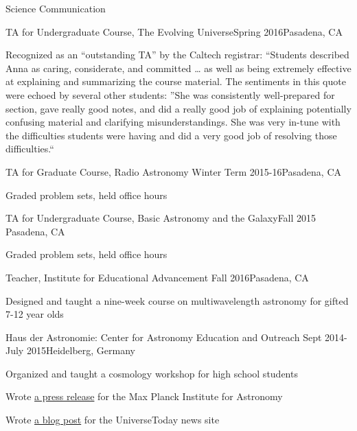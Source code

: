\documentclass{resume} %
\begin{document}
\begin{rSection}{Science Communication}
  \begin{rSubsection}
    {TA for Undergraduate Course, The Evolving Universe}{Spring 2016}{}{Pasadena, CA}
  \item Recognized as an ``outstanding TA'' by the Caltech registrar:
    ``Students described Anna as caring, considerate, and committed \ldots 
    as well as being extremely effective at explaining and summarizing the 
    course material. The sentiments in this quote were echoed by several other 
    students: ''She was consistently well-prepared for section, 
    gave really good notes, and did a really good job of explaining 
    potentially confusing material and clarifying misunderstandings. 
    She was very in-tune with the difficulties students were having 
    and did a very good job of resolving those difficulties.``
  \end{rSubsection}


  \begin{rSubsection}{TA for Graduate Course, Radio Astronomy}
    {Winter Term 2015-16}{}{Pasadena, CA}
  \item Graded problem sets, held office hours
  \end{rSubsection}

  \begin{rSubsection}
    {TA for Undergraduate Course, Basic Astronomy and the Galaxy}{Fall 2015}
    {}{Pasadena, CA}
  \item Graded problem sets, held office hours
  \end{rSubsection}

  \begin{rSubsection}{Teacher, Institute for Educational Advancement}
    {Fall 2016}{}{Pasadena, CA}
  \item Designed and taught a nine-week course on multiwavelength astronomy
    for gifted 7-12 year olds
  \end{rSubsection}

  \begin{rSubsection}
    {Haus der Astronomie: Center for Astronomy Education and Outreach}
    {Sept 2014-July 2015}{}{Heidelberg, Germany}
  \item Organized and taught a cosmology workshop for high school students
  \item Wrote \href{http://www.mpia.de/news/science/2015-03-biosignatures}
    {a press release} for the Max Planck Institute for Astronomy
  \item Wrote \href{http://www.universetoday.com/120820/distant-stellar-nurseries-this-time-in-high-definition/}
    {a blog post} for the UniverseToday news site


\end{rSubsection}
\end{rSection}
\end{document}
